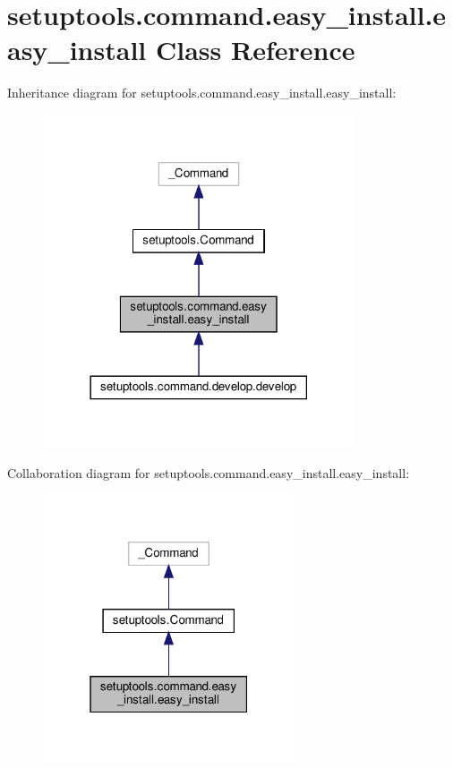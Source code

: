 \hypertarget{classsetuptools_1_1command_1_1easy__install_1_1easy__install}{}\section{setuptools.\+command.\+easy\+\_\+install.\+easy\+\_\+install Class Reference}
\label{classsetuptools_1_1command_1_1easy__install_1_1easy__install}


Inheritance diagram for setuptools.\+command.\+easy\+\_\+install.\+easy\+\_\+install\+:
\nopagebreak
\begin{figure}[H]
\begin{center}
\leavevmode
\includegraphics[width=261pt]{classsetuptools_1_1command_1_1easy__install_1_1easy__install__inherit__graph}
\end{center}
\end{figure}


Collaboration diagram for setuptools.\+command.\+easy\+\_\+install.\+easy\+\_\+install\+:
\nopagebreak
\begin{figure}[H]
\begin{center}
\leavevmode
\includegraphics[width=211pt]{classsetuptools_1_1command_1_1easy__install_1_1easy__install__coll__graph}
\end{center}
\end{figure}
